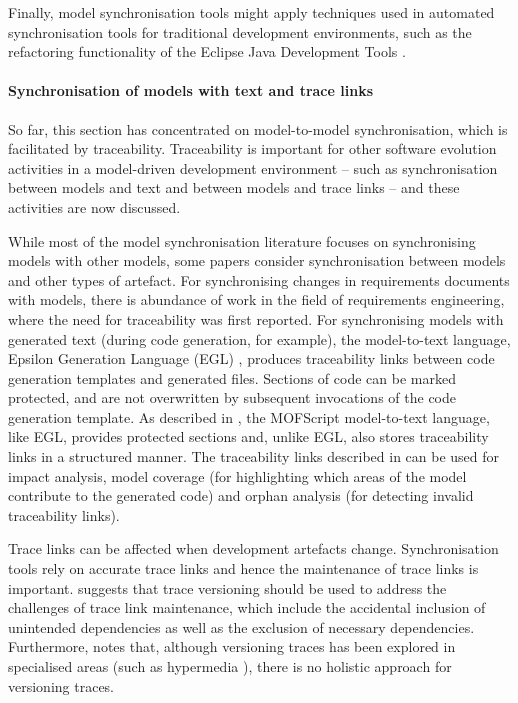 Finally, model synchronisation tools might apply techniques used in automated synchronisation tools for traditional development environments, such as the refactoring functionality of the Eclipse Java Development Tools \cite{fuhrer07refactoring}.


\paragraph{Synchronisation of models with text and trace links}
So far, this section has concentrated on model-to-model synchronisation, which is facilitated by traceability. Traceability is important for other software evolution activities in a model-driven development environment -- such as synchronisation between models and text and between models and trace links -- and these activities are now discussed.

While most of the model synchronisation literature focuses on synchronising models with other models, some papers consider synchronisation between models and other types of artefact. For synchronising changes in requirements documents with models, there is abundance of work in the field of requirements engineering, where the need for traceability was first reported. For synchronising models with generated text (during code generation, for example), the model-to-text language, Epsilon Generation Language (EGL) \cite{rose08egl}, produces traceability links between code generation templates and generated files. Sections of code can be marked protected, and are not overwritten by subsequent invocations of the code generation template. As described in \cite{olsen07traceability}, the MOFScript model-to-text language, like EGL, provides protected sections and, unlike EGL, also stores traceability links in a structured manner. The traceability links described in \cite{olsen07traceability} can be used for impact analysis, model coverage (for highlighting which areas of the model contribute to the generated code) and orphan analysis (for detecting invalid traceability links).

Trace links can be affected when development artefacts change. Synchronisation tools rely on accurate trace links and hence the maintenance of trace links is important. \cite{winkler09survey} suggests that trace versioning should be used to address the challenges of trace link maintenance, which include the accidental inclusion of unintended dependencies as well as the exclusion of necessary dependencies. Furthermore, \cite{winkler09survey} notes that, although versioning traces has been explored in specialised areas (such as hypermedia \cite{nguyen05versioning}), there is no holistic approach for versioning traces.


